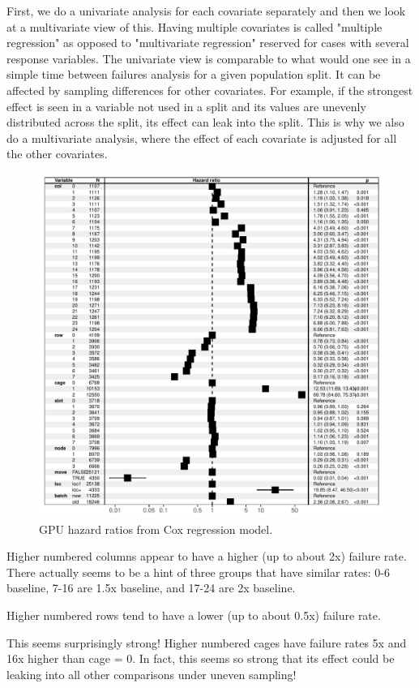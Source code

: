 First, we do a univariate analysis for each covariate separately and
then we look at a multivariate view of this. Having multiple
covariates is called "multiple regression" as opposed to "multivariate
regression" reserved for cases with several response variables. The
univariate view is comparable to what would one see in a simple time
between failures analysis for a given population split. It can be
affected by sampling differences for other covariates. For example, if
the strongest effect is seen in a variable not used in a split and its
values are unevenly distributed across the split, its effect can leak
into the split. This is why we also do a multivariate analysis, where
the effect of each covariate is adjusted for all the other
covariates. 
 

\begin{figure}
  \includegraphics[width=5in]{cox.pdf}
  \caption{GPU hazard ratios from Cox regression model.}
\end{figure}

Higher numbered columns appear to have a higher (up to about 2x)
failure rate. There actually seems to be a hint of three groups that
have similar rates: 0-6 baseline, 7-16 are 1.5x baseline, and 17-24
are 2x baseline. 

Higher numbered rows tend to have a lower (up to about 0.5x) failure rate.

This seems surprisingly strong! Higher numbered cages have failure
rates 5x and 16x higher than cage = 0. In fact, this seems so strong
that its effect could be leaking into all other comparisons under
uneven sampling!

